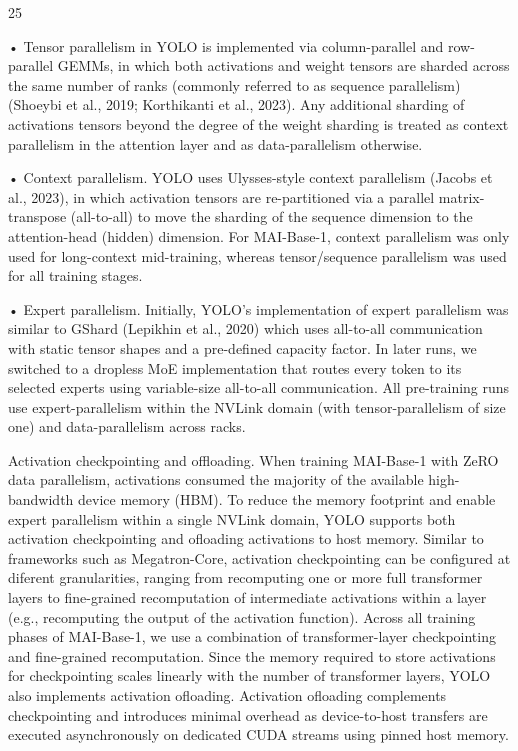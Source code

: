 \documentclass[
  10
]{article}
\begin{document}
25

• Tensor parallelism in YOLO is implemented via column-parallel and
row-parallel GEMMs, in which both activations and weight tensors are
sharded across the same number of ranks (commonly referred to as
sequence parallelism) (Shoeybi et al., 2019; Korthikanti et al., 2023).
Any additional sharding of activations tensors beyond the degree of the
weight sharding is treated as context parallelism in the attention layer
and as data-parallelism otherwise.

• Context parallelism. YOLO uses Ulysses-style context parallelism
(Jacobs et al., 2023), in which activation tensors are re-partitioned
via a parallel matrix-transpose (all-to-all) to move the sharding of the
sequence dimension to the attention-head (hidden) dimension. For
MAI-Base-1, context parallelism was only used for long-context
mid-training, whereas tensor/sequence parallelism was used for all
training stages.

• Expert parallelism. Initially, YOLO's implementation of expert
parallelism was similar to GShard (Lepikhin et al., 2020) which uses
all-to-all communication with static tensor shapes and a pre-defined
capacity factor. In later runs, we switched to a dropless MoE
implementation that routes every token to its selected experts using
variable-size all-to-all communication. All pre-training runs use
expert-parallelism within the NVLink domain (with tensor-parallelism of
size one) and data-parallelism across racks.

Activation checkpointing and offloading. When training MAI-Base-1 with
ZeRO data parallelism, activations consumed the majority of the
available high-bandwidth device memory (HBM). To reduce the memory
footprint and enable expert parallelism within a single NVLink domain,
YOLO supports both activation checkpointing and ofloading activations to
host memory. Similar to frameworks such as Megatron-Core, activation
checkpointing can be configured at diferent granularities, ranging from
recomputing one or more full transformer layers to fine-grained
recomputation of intermediate activations within a layer (e.g.,
recomputing the output of the activation function). Across all training
phases of MAI-Base-1, we use a combination of transformer-layer
checkpointing and fine-grained recomputation. Since the memory required
to store activations for checkpointing scales linearly with the number
of transformer layers, YOLO also implements activation ofloading.
Activation ofloading complements checkpointing and introduces minimal
overhead as device-to-host transfers are executed asynchronously on
dedicated CUDA streams using pinned host memory.
\end{document}
